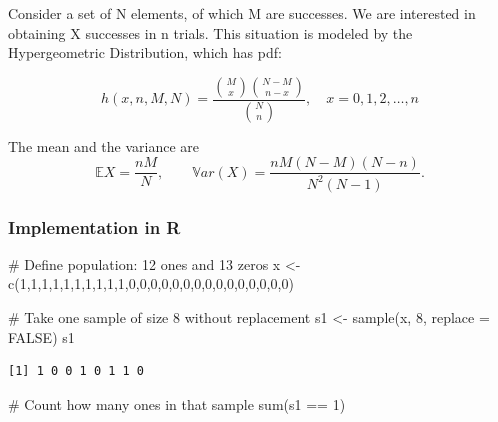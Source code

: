 \documentclass[
  letterpaper,
  DIV=11,
  numbers=noendperiod]{scrreprt}
\newenvironment{Shaded}{\begin{snugshade}}{\end{snugshade}}
\newcommand{\AttributeTok}[1]{\textcolor[rgb]{0.40,0.45,0.13}{#1}}
\newcommand{\CommentTok}[1]{\textcolor[rgb]{0.37,0.37,0.37}{#1}}
\newcommand{\ConstantTok}[1]{\textcolor[rgb]{0.56,0.35,0.01}{#1}}
\newcommand{\DecValTok}[1]{\textcolor[rgb]{0.68,0.00,0.00}{#1}}
\newcommand{\FunctionTok}[1]{\textcolor[rgb]{0.28,0.35,0.67}{#1}}
\newcommand{\NormalTok}[1]{\textcolor[rgb]{0.00,0.23,0.31}{#1}}
\newcommand{\OtherTok}[1]{\textcolor[rgb]{0.00,0.23,0.31}{#1}}
\newcommand{\SpecialCharTok}[1]{\textcolor[rgb]{0.37,0.37,0.37}{#1}}
\begin{document}
Consider a set of N elements, of which M are successes. We are
interested in obtaining X successes in n trials. This situation is
modeled by the Hypergeometric Distribution, which has pdf:

\[h(x,n,M,N) = \frac{\binom{M}{x}\binom{N-M}{n-x}}{\binom{N}{n}}, \quad x = 0,1,2,\ldots,n\]

The mean and the variance are \[\mathbb EX = \frac{nM}{N}, \qquad
\mathbb{V}ar(X) = \frac{nM(N-M)(N-n)}{N^2(N-1)}.\]

\subsubsection{Implementation in R}\label{implementation-in-r-3}

\begin{Shaded}
\begin{Highlighting}[]
\CommentTok{\# Define population: 12 ones and 13 zeros}
\NormalTok{x }\OtherTok{\textless{}{-}} \FunctionTok{c}\NormalTok{(}\DecValTok{1}\NormalTok{,}\DecValTok{1}\NormalTok{,}\DecValTok{1}\NormalTok{,}\DecValTok{1}\NormalTok{,}\DecValTok{1}\NormalTok{,}\DecValTok{1}\NormalTok{,}\DecValTok{1}\NormalTok{,}\DecValTok{1}\NormalTok{,}\DecValTok{1}\NormalTok{,}\DecValTok{1}\NormalTok{,}\DecValTok{0}\NormalTok{,}\DecValTok{0}\NormalTok{,}\DecValTok{0}\NormalTok{,}\DecValTok{0}\NormalTok{,}\DecValTok{0}\NormalTok{,}\DecValTok{0}\NormalTok{,}\DecValTok{0}\NormalTok{,}\DecValTok{0}\NormalTok{,}\DecValTok{0}\NormalTok{,}\DecValTok{0}\NormalTok{,}\DecValTok{0}\NormalTok{,}\DecValTok{0}\NormalTok{,}\DecValTok{0}\NormalTok{,}\DecValTok{0}\NormalTok{,}\DecValTok{0}\NormalTok{)}

\CommentTok{\# Take one sample of size 8 without replacement}
\NormalTok{s1 }\OtherTok{\textless{}{-}} \FunctionTok{sample}\NormalTok{(x, }\DecValTok{8}\NormalTok{, }\AttributeTok{replace =} \ConstantTok{FALSE}\NormalTok{)}
\NormalTok{s1}
\end{Highlighting}
\end{Shaded}

\begin{verbatim}
[1] 1 0 0 1 0 1 1 0
\end{verbatim}

\begin{Shaded}
\begin{Highlighting}[]
\CommentTok{\# Count how many ones in that sample}
\FunctionTok{sum}\NormalTok{(s1 }\SpecialCharTok{==} \DecValTok{1}\NormalTok{)}
\end{Highlighting}
\end{Shaded}
\end{document}
